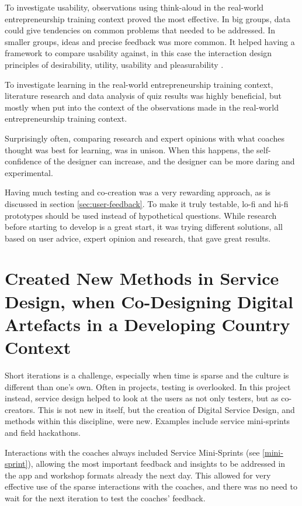 To investigate usability, observations using think-aloud in the real-world entrepreneurship training context proved the most effective. In big groups, data could give tendencies on common problems that needed to be addressed. In smaller groups, ideas and precise feedback was more common. It helped having a framework to compare usability against, in this case the interaction design principles of desirability, utility, usability and pleasurability \citep{clatworthy}.

To investigate learning in the real-world entrepreneurship training context, literature research and data analysis of quiz results was highly beneficial, but mostly when put into the context of the observations made in the real-world entrepreneurship training context.

Surprisingly often, comparing research and expert opinions with what coaches thought was best for learning, was in unison. When this happens, the self-confidence of the designer can increase, and the designer can be more daring and experimental.

Having much testing and co-creation was a very rewarding approach, as is discussed in section \ref{sec:user-feedback}. To make it truly testable, lo-fi and hi-fi prototypes should be used instead of hypothetical questions. While research before starting to develop is a great start, it was trying different solutions, all based on user advice, expert opinion and research, that gave great results.

\section{Created New Methods in Service Design, when Co-Designing Digital Artefacts in a Developing Country Context}
Short iterations is a challenge, especially when time is sparse and the culture is different than one's own. Often in projects, testing is overlooked. In this project instead, service design helped to look at the users as not only testers, but as co-creators. This is not new in itself, but the creation of Digital Service Design, and methods within this discipline, were new. Examples include service mini-sprints and field hackathons.

Interactions with the coaches always included Service Mini-Sprints (see \ref{mini-sprint}), allowing the most important feedback and insights to be addressed in the app and workshop formats already the next day. This allowed for very effective use of the sparse interactions with the coaches, and there was no need to wait for the next iteration to test the coaches' feedback.

